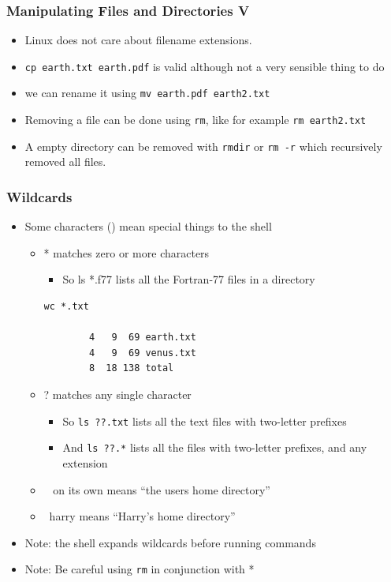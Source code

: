 \begin{frame}[fragile]\frametitle{Manipulating Files and Directories V}
\begin{itemize}
\item Linux does not care about filename extensions.
\item \lstinline!cp earth.txt earth.pdf! is valid although not a very sensible thing to do
\item we can rename it using \lstinline!mv earth.pdf earth2.txt!
\item Removing a file can be done using \lstinline!rm!, like for example \lstinline!rm earth2.txt!
\item A empty directory can be removed with \lstinline!rmdir! or \lstinline!rm -r! which recursively removed all files.
\end{itemize}
\end{frame}

\begin{frame}[fragile]\frametitle{Wildcards}
\begin{itemize}
\item Some characters () mean special things to the shell
\begin{itemize}
    \item * matches zero or more characters
\begin{itemize}
          \item So ls *.f77 lists all the Fortran-77 files in a directory
\end{itemize}
\codesmall
\codelist
\begin{lstlisting}[linewidth=6cm]
      wc *.txt

        4   9  69 earth.txt
        4   9  69 venus.txt
        8  18 138 total
\end{lstlisting}
\codenormal
    \item ? matches any single character
\begin{itemize}
          \item So \lstinline!ls ??.txt! lists all the text files with two-letter prefixes
          \item And \lstinline!ls ??.*! lists all the files with two-letter prefixes, and any extension
\end{itemize}
    \item ~ on its own means “the users home directory”
    \item ~harry means “Harry's home directory”
\end{itemize}
\item Note: the shell expands wildcards before running commands
\item Note: Be careful using \lstinline!rm! in conjunction with *
\end{itemize}
\end{frame}

